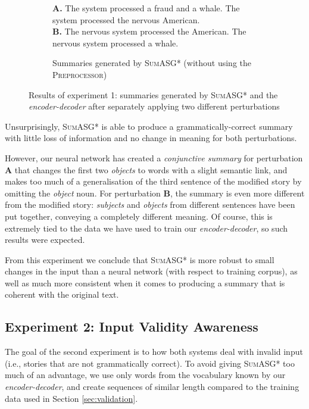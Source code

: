 \begin{figure}[H]
\begin{subfigure}{\textwidth}
\begin{displayquote}
\textbf{A.} The system processed a fraud and a whale. The system processed the nervous American. \\
\textbf{B.} The nervous system processed the American. The nervous system processed a whale.
\end{displayquote}
\caption{Summaries generated by \textsc{SumASG*} (without using the \textsc{Preprocessor})}
\end{subfigure}
\caption{Results of experiment 1: summaries generated by \textsc{SumASG*} and the \textit{encoder-decoder} after separately applying two different perturbations}
\label{fig:experiment_1}
\end{figure}

\noindent
Unsurprisingly, \textsc{SumASG*} is able to produce a grammatically-correct summary with little loss of information and no change in meaning for both perturbations.

However, our neural network has created a \textit{conjunctive summary} for perturbation \textbf{A} that changes the first two \textit{objects} to words with a slight semantic link, and makes too much of a generalisation of the third sentence of the modified story by omitting the \textit{object} noun. For perturbation \textbf{B}, the summary is even more different from the modified story: \textit{subjects} and \textit{objects} from different sentences have been put together, conveying a completely different meaning. Of course, this is extremely tied to the data we have used to train our \textit{encoder-decoder}, so such results were expected.

From this experiment we conclude that \textsc{SumASG*} is more robust to small changes in the input than a neural network (with respect to training corpus), as well as much more consistent when it comes to producing a summary that is coherent with the original text.

\subsection{Experiment 2: Input Validity Awareness}
\label{subsec:experiment_2}

The goal of the second experiment is to how both systems deal with invalid input (i.e., stories that are not grammatically correct). To avoid giving \textsc{SumASG*} too much of an advantage, we use only words from the vocabulary known by our \textit{encoder-decoder}, and create sequences of similar length compared to the training data used in Section \ref{sec:validation}.


